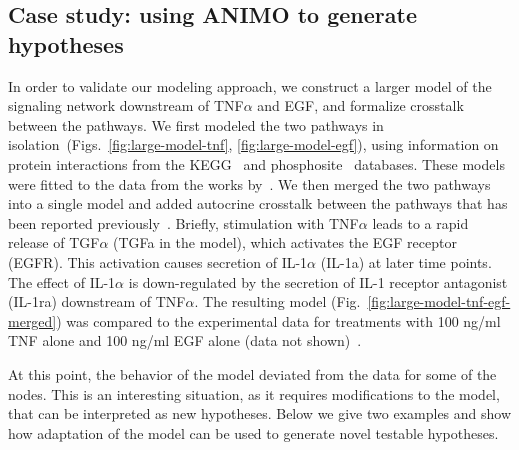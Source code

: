 \subsection{Case study: using ANIMO to generate hypotheses}\label{subsec:case-study-larger}
In order to validate our modeling approach,
we construct a larger model of the signaling network downstream of TNF$\alpha$ and EGF, and formalize crosstalk between the pathways.
 We first modeled the two pathways in isolation~(Figs.~\ref{fig:large-model-tnf}, \ref{fig:large-model-egf}),
using information on protein interactions from
the KEGG~\citep{kegg} and phosphosite~\citep{phosphosite} databases. These models were fitted to the data
from the works by~\citet{pathway-compendium,pathway-autocrine}.
We then merged the two pathways into a single model and added autocrine crosstalk between the pathways that has been
reported previously~\citep{pathway-autocrine}.
Briefly, stimulation with TNF$\alpha$ leads to a rapid release of TGF$\alpha$ ({\sf TGFa} in the model), which activates the EGF receptor ({\sf EGFR}).
This activation causes secretion of IL-1$\alpha$ ({\sf IL-1a}) at later time points.
The effect of IL-1$\alpha$ is down-regulated by the secretion of IL-1 receptor antagonist ({\sf IL-1ra}) downstream of TNF$\alpha$.
The resulting model (Fig.~\ref{fig:large-model-tnf-egf-merged}) was compared to the experimental data for treatments with 100 ng/ml TNF alone
and 100 ng/ml EGF alone (data not shown)~\citep{pathway-compendium}.

At this point, the behavior of the model deviated from the data for some of the nodes.
This is an interesting situation, as it requires
modifications to the model, that can be interpreted as new hypotheses. Below we give two examples and show how
adaptation of the model can be used to generate novel testable hypotheses.



